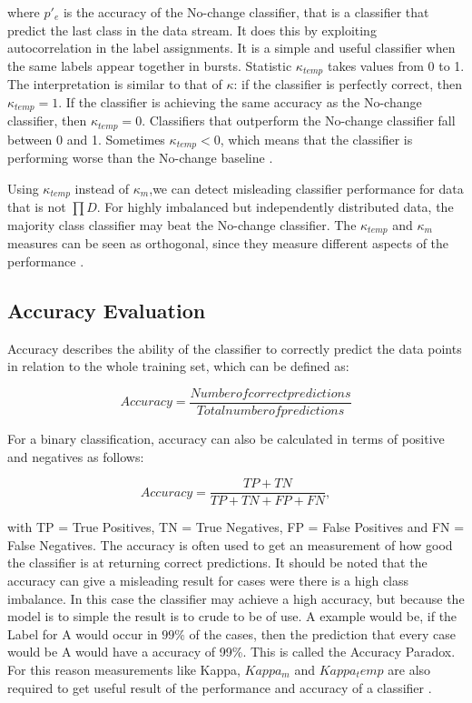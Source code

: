 \documentclass[12pt,oneside,a4paper,parskip]{scrbook}
\begin{document}
where $p'_e$ is the accuracy of the No-change classifier, that is a classifier that predict the last class in the data stream. 
It does this by exploiting autocorrelation in the label assignments. It is a simple and useful classifier when the same labels appear together in bursts.
Statistic $\kappa_\textit{temp}$ takes values from 0 to 1. The interpretation is similar to that of $\kappa$: if the
classifier is perfectly correct, then $\kappa_\textit{temp} = 1$. If the classifier is achieving the same accuracy as the No-change
classifier, then $\kappa_\textit{temp} = 0$. Classifiers that outperform the No-change classifier fall between 0 and 1. Sometimes
$\kappa_\textit{temp} < 0$, which means that the classifier is performing worse than the No-change baseline \cite{MLonDataStreams}.

Using $\kappa_\textit{temp}$ instead of $\kappa_m$,we can detect misleading classifier performance for data that is not $\prod D$. 
For highly imbalanced but independently distributed data, the majority class classifier may beat the No-change classifier.
The $\kappa_\textit{temp}$ and $\kappa_m$ measures can be seen as orthogonal, since they measure different aspects of the performance \cite{MLonDataStreams}.

\subsection{Accuracy Evaluation}
Accuracy describes the ability of the classifier to correctly predict the data points in relation to the whole training set,
which can be defined as:

\begin{equation}
  Accuracy = \frac{Number of correct predictions}{Total number of predictions}
\end{equation}

For a binary classification, accuracy can also be calculated in terms of positive and negatives as follows:

\begin{equation}
  Accuracy = \frac{TP+TN}{TP+TN+FP+FN},
\end{equation}

with TP = True Positives, TN = True Negatives, FP = False Positives and FN = False Negatives.
The accuracy is often used to get an measurement of how good the classifier is at returning correct predictions. 
It should be noted that the accuracy can give a misleading result for  cases were there is a high class imbalance.
In this case the classifier may achieve a high accuracy, but because the model is to simple the result is to crude to be of use.
A example would be, if the Label for A would occur in $99\%$ of the cases, then the prediction that every case would be A 
would have a accuracy of 99\%. This is called the Accuracy Paradox.
For this reason measurements like Kappa, $Kappa_m$ and $Kappa_temp$ are also required to get useful result of the
performance and accuracy of a classifier \cite{MLonDataStreams}.
\end{document}
